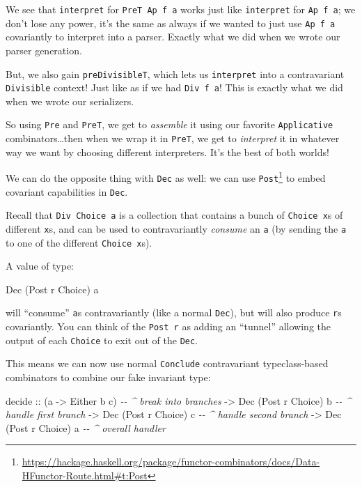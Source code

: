 \documentclass[]{article}
\newenvironment{Shaded}{}{}
\newcommand{\CommentTok}[1]{\textcolor[rgb]{0.38,0.63,0.69}{\textit{#1}}}
\newcommand{\DataTypeTok}[1]{\textcolor[rgb]{0.56,0.13,0.00}{#1}}
\newcommand{\NormalTok}[1]{#1}
\newcommand{\OtherTok}[1]{\textcolor[rgb]{0.00,0.44,0.13}{#1}}
\renewcommand{\href}[2]{#2\footnote{\url{#1}}}
\begin{document}
We see that \texttt{interpret} for \texttt{PreT\ Ap\ f\ a} works just like
\texttt{interpret} for \texttt{Ap\ f\ a}; we don't lose any power, it's the same
as always if we wanted to just use \texttt{Ap\ f\ a} covariantly to interpret
into a parser. Exactly what we did when we wrote our parser generation.

But, we also gain \texttt{preDivisibleT}, which lets us \texttt{interpret} into
a contravariant \texttt{Divisible} context! Just like as if we had
\texttt{Div\ f\ a}! This is exactly what we did when we wrote our serializers.

So using \texttt{Pre} and \texttt{PreT}, we get to \emph{assemble} it using our
favorite \texttt{Applicative} combinators\ldots then when we wrap it in
\texttt{PreT}, we get to \emph{interpret} it in whatever way we want by choosing
different interpreters. It's the best of both worlds!

We can do the opposite thing with \texttt{Dec} as well: we can use
\href{https://hackage.haskell.org/package/functor-combinators/docs/Data-HFunctor-Route.html\#t:Post}{\texttt{Post}}
to embed covariant capabilities in \texttt{Dec}.

Recall that \texttt{Div\ Choice\ a} is a collection that contains a bunch of
\texttt{Choice\ x}s of different \texttt{x}s, and can be used to contravariantly
\emph{consume} an \texttt{a} (by sending the \texttt{a} to one of the different
\texttt{Choice\ x}s).

A value of type:

\begin{Shaded}
\begin{Highlighting}[]
\DataTypeTok{Dec}\NormalTok{ (}\DataTypeTok{Post}\NormalTok{ r }\DataTypeTok{Choice}\NormalTok{) a}
\end{Highlighting}
\end{Shaded}

will ``consume'' \texttt{a}s contravariantly (like a normal \texttt{Dec}), but
will also produce \texttt{r}s covariantly. You can think of the \texttt{Post\ r}
as adding an ``tunnel'' allowing the output of each \texttt{Choice} to exit out
of the \texttt{Dec}.

This means we can now use normal \texttt{Conclude} contravariant typeclass-based
combinators to combine our fake invariant type:

\begin{Shaded}
\begin{Highlighting}[]
\NormalTok{decide}
\OtherTok{    ::}\NormalTok{ (a }\OtherTok{{-}>} \DataTypeTok{Either}\NormalTok{ b c)        }\CommentTok{{-}{-} \^{} break into branches}
    \OtherTok{{-}>} \DataTypeTok{Dec}\NormalTok{ (}\DataTypeTok{Post}\NormalTok{ r }\DataTypeTok{Choice}\NormalTok{) b    }\CommentTok{{-}{-} \^{} handle first branch}
    \OtherTok{{-}>} \DataTypeTok{Dec}\NormalTok{ (}\DataTypeTok{Post}\NormalTok{ r }\DataTypeTok{Choice}\NormalTok{) c    }\CommentTok{{-}{-} \^{} handle second branch}
    \OtherTok{{-}>} \DataTypeTok{Dec}\NormalTok{ (}\DataTypeTok{Post}\NormalTok{ r }\DataTypeTok{Choice}\NormalTok{) a    }\CommentTok{{-}{-} \^{} overall handler}
\end{Highlighting}
\end{Shaded}
\end{document}
